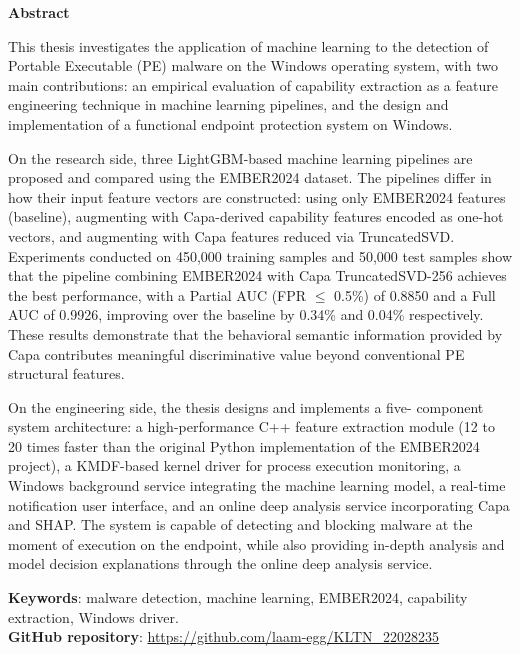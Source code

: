 \begin{center}
\textbf{\large{Abstract}	}
\end{center}

\begin{small}


This thesis investigates the application of machine learning to the
detection of Portable Executable (PE) malware on the Windows operating
system, with two main contributions: an empirical evaluation of
capability extraction as a feature engineering technique in machine
learning pipelines, and the design and implementation of a functional
endpoint protection system on Windows.

On the research side, three LightGBM-based machine learning pipelines
are proposed and compared using the EMBER2024 dataset. The pipelines
differ in how their input feature vectors are constructed: using only
EMBER2024 features (baseline), augmenting with Capa-derived capability
features encoded as one-hot vectors, and augmenting with Capa features
reduced via TruncatedSVD. Experiments conducted on 450,000 training
samples and 50,000 test samples show that the pipeline combining
EMBER2024 with Capa TruncatedSVD-256 achieves the best performance,
with a Partial AUC (FPR $\leq$ 0.5\%) of 0.8850 and a Full AUC of
0.9926, improving over the baseline by 0.34\% and 0.04\% respectively.
These results demonstrate that the behavioral semantic information
provided by Capa contributes meaningful discriminative value beyond
conventional PE structural features.

On the engineering side, the thesis designs and implements a five-
component system architecture: a high-performance C++ feature
extraction module (12 to 20 times faster than the original Python
implementation of the EMBER2024 project), a KMDF-based kernel driver for process execution
monitoring, a Windows background service integrating the machine
learning model, a real-time notification user interface, and an online
deep analysis service incorporating Capa and SHAP. The system is
capable of detecting and blocking malware at the moment of execution
on the endpoint, while also providing in-depth analysis and model
decision explanations through the online deep analysis service.

\vspace*{1cm}
\textbf{Keywords}: malware detection, machine learning,
EMBER2024, capability extraction, Windows driver.
\\
\textbf{GitHub repository}: \url{https://github.com/laam-egg/KLTN_22028235}

\end{small}

